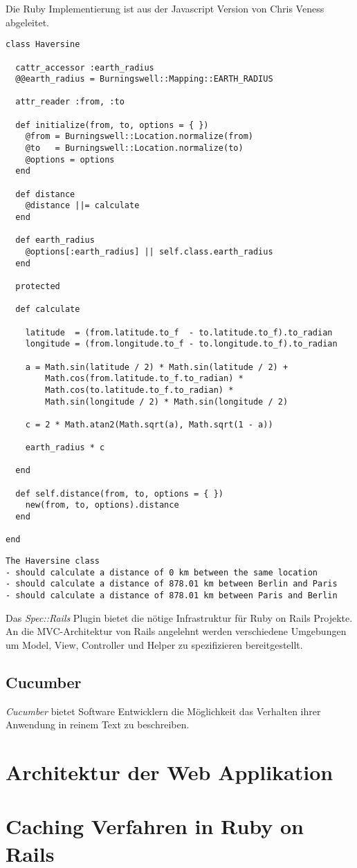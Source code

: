 Die Ruby Implementierung ist aus der Javascript Version
\cite{movable_type_scripts} von Chris Veness abgeleitet.

{\small
\begin{verbatim}
class Haversine

  cattr_accessor :earth_radius
  @@earth_radius = Burningswell::Mapping::EARTH_RADIUS

  attr_reader :from, :to

  def initialize(from, to, options = { })
    @from = Burningswell::Location.normalize(from)
    @to   = Burningswell::Location.normalize(to)
    @options = options
  end

  def distance
    @distance ||= calculate
  end

  def earth_radius
    @options[:earth_radius] || self.class.earth_radius
  end

  protected

  def calculate

    latitude  = (from.latitude.to_f  - to.latitude.to_f).to_radian
    longitude = (from.longitude.to_f - to.longitude.to_f).to_radian

    a = Math.sin(latitude / 2) * Math.sin(latitude / 2) +
        Math.cos(from.latitude.to_f.to_radian) *
        Math.cos(to.latitude.to_f.to_radian) *
        Math.sin(longitude / 2) * Math.sin(longitude / 2)

    c = 2 * Math.atan2(Math.sqrt(a), Math.sqrt(1 - a))

    earth_radius * c

  end

  def self.distance(from, to, options = { })
    new(from, to, options).distance
  end

end
\end{verbatim}
}


{\small
\begin{verbatim}
The Haversine class
- should calculate a distance of 0 km between the same location
- should calculate a distance of 878.01 km between Berlin and Paris
- should calculate a distance of 878.01 km between Paris and Berlin
\end{verbatim}
}

Das \textit{Spec::Rails} Plugin bietet die nötige Infrastruktur für
Ruby on Rails Projekte. An die MVC-Architektur von Rails angelehnt
werden verschiedene Umgebungen um Model, View, Controller und Helper
zu spezifizieren bereitgestellt.

\subsection{Cucumber}

\textit{Cucumber} bietet Software Entwicklern die Möglichkeit das
Verhalten ihrer Anwendung in reinem Text zu beschreiben.

\section{Architektur der Web Applikation}
\section{Caching Verfahren in Ruby on Rails}

